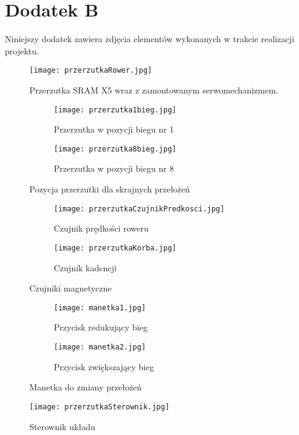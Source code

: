 \chapter*{Dodatek B}

Niniejszy dodatek zawiera zdjęcia elementów wykonanych w trakcie realizacji projektu.

\begin{figure}[h]
    \centering
    \texttt{[image: przerzutkaRower.jpg]}
    \caption{Przerzutka SRAM X5 wraz z zamontowanym serwomechanizmem.}
    \label{fig:Rower}
\end{figure}


\begin{figure}[h]
\centering
\begin{subfigure}{.4\textwidth}
  \centering
  \texttt{[image: przerzutka1bieg.jpg]}
  \caption{Przerzutka w pozycji biegu nr 1}

\end{subfigure}
\begin{subfigure}{.4\textwidth}
  \centering
  \texttt{[image: przerzutka8bieg.jpg]}
  \caption{Przerzutka w pozycji biegu nr 8}

\end{subfigure}
\caption{Pozycja przerzutki dla skrajnych przełożeń}
\label{fig:test}
\end{figure}

\begin{figure}[h]
\centering
\begin{subfigure}{.4\textwidth}
  \centering
  \texttt{[image: przerzutkaCzujnikPredkosci.jpg]}
  \caption{Czujnik prędkości roweru}
\end{subfigure}
\begin{subfigure}{.4\textwidth}
  \centering
  \texttt{[image: przerzutkaKorba.jpg]}
  \caption{Czujnik kadencji}

\end{subfigure}
\caption{Czujniki magnetyczne}
\label{fig:test}
\end{figure}

\begin{figure}[h]
\centering
\begin{subfigure}{.4\textwidth}
  \centering
  \texttt{[image: manetka1.jpg]}
  \caption{Przycisk redukujący bieg}
\end{subfigure}
\begin{subfigure}{.4\textwidth}
  \centering
  \texttt{[image: manetka2.jpg]}
  \caption{Przycisk zwiększający bieg}
\end{subfigure}
\caption{Manetka do zmiany przełożeń}
\label{fig:test}
\end{figure}

\begin{figure}[h]
    \centering
    \texttt{[image: przerzutkaSterownik.jpg]}
    \caption{Sterownik układu}
    \label{fig:sterownik}
\end{figure}